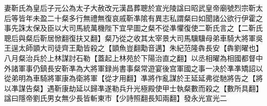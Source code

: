 妻靳氏為皇后子元公為太子大赦改元漢昌葬聰於宣光陵諡曰昭武皇帝廟號烈宗靳太后等皆年未盈二十粲多行無禮無復哀戚靳凖隂有異志私謂粲曰如聞諸公欲行伊霍之事先誅太保及臣以大司馬統萬機陛下宜早圖之粲不從凖懼復使二靳氏言之【二靳氏聰后與粲后靳居惞翻復扶又翻】粲乃從之收其太宰景大司馬驥驥母弟車騎大將軍吳王逞太師顗大司徒齊王勱皆殺之【顗魚豈翻勱音邁】朱紀范隆犇長安【犇劉曜也】八月粲治兵於上林謀討石勒【蓋起上林苑於下陽治直之翻】以丞相曜為相國都督中外諸軍事仍鎮長安靳凖為大將軍録尚書事粲常遊宴後宫軍國之事一决於凖凖矯詔以從弟明為車騎將軍康為衛將軍【從才用翻】凖將作亂謀於王延延弗從馳將告之【將以凖謀告粲】遇靳康劫延以歸凖遂勒兵升光極殿使甲士執粲數而殺之【數所具翻】諡曰隱帝劉氏男女無少長皆斬東市【少詩照翻長知兩翻】發永光宣光二